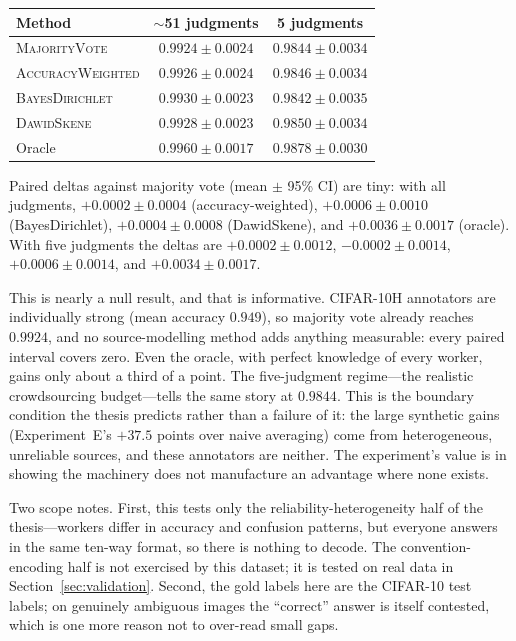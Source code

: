 {\small
\begin{center}
\begin{tabular}{lcc}
\toprule
Method & $\sim$51 judgments & 5 judgments \\
\midrule
\textsc{MajorityVote} & $0.9924 \pm 0.0024$ & $0.9844 \pm 0.0034$ \\
\textsc{AccuracyWeighted} & $0.9926 \pm 0.0024$ & $0.9846 \pm 0.0034$ \\
\textsc{BayesDirichlet} & $0.9930 \pm 0.0023$ & $0.9842 \pm 0.0035$ \\
\textsc{DawidSkene} & $0.9928 \pm 0.0023$ & $0.9850 \pm 0.0034$ \\
Oracle & $0.9960 \pm 0.0017$ & $0.9878 \pm 0.0030$ \\
\bottomrule
\end{tabular}
\end{center}
}

Paired deltas against majority vote (mean $\pm$ 95\% CI) are tiny: with all
judgments, $+0.0002 \pm 0.0004$ (accuracy-weighted), $+0.0006 \pm 0.0010$
(BayesDirichlet), $+0.0004 \pm 0.0008$ (DawidSkene), and $+0.0036 \pm 0.0017$
(oracle). With five judgments the deltas are $+0.0002 \pm 0.0012$,
$-0.0002 \pm 0.0014$, $+0.0006 \pm 0.0014$, and $+0.0034 \pm 0.0017$.

This is nearly a null result, and that is
informative. CIFAR-10H annotators are individually strong (mean accuracy
$0.949$), so majority vote already reaches $0.9924$, and no
source-modelling method adds anything measurable: every paired interval
covers zero. Even the oracle, with perfect knowledge of every worker,
gains only about a third of a point. The five-judgment regime---the
realistic crowdsourcing budget---tells the same story at $0.9844$.
This is the boundary condition the thesis predicts rather than a
failure of it: the large synthetic gains (Experiment~E's $+37.5$ points
over naive averaging) come from heterogeneous, unreliable sources, and
these annotators are neither. The experiment's value is in showing the
machinery does not manufacture an advantage where none exists.

Two scope notes. First, this tests only the reliability-heterogeneity
half of the thesis---workers differ in accuracy and confusion patterns,
but everyone answers in the same ten-way format, so there is nothing to
decode. The convention-encoding half is not exercised by this dataset;
it is tested on real data in Section~\ref{sec:validation}. Second, the gold labels here are the CIFAR-10 test
labels; on genuinely ambiguous images the ``correct'' answer is itself
contested, which is one more reason not to over-read small gaps.


